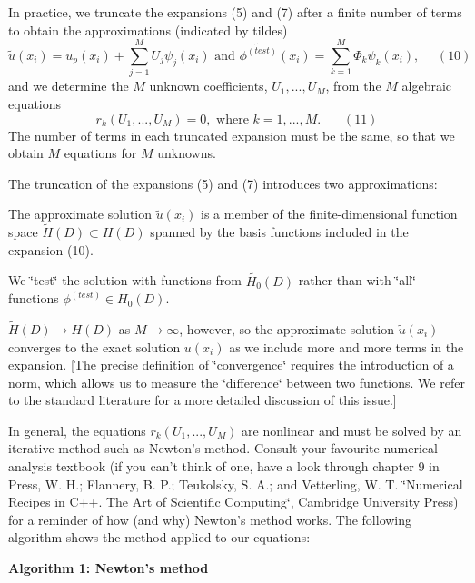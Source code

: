 In practice, we truncate the expansions (5) and (7) after a finite number of terms to obtain the approximations (indicated by tildes) \[ \widetilde{u}(x_i) = u_p(x_i) + \sum_{j=1}^{M} U_j \psi_j(x_i) \mbox{ \ \ and \ \ } \widetilde{\phi^{(test)}}(x_i) = \sum_{k=1}^{M} \Phi_k \psi_k(x_i), \ \ \ \ \ \ (10) \] and we determine the $M$ unknown coefficients, $U_1,...,U_M$, from the $M$ algebraic equations \[ r_k(U_1,...,U_M)=0, \mbox{\ \ where \ \ $k=1,...,M$}. \ \ \ \ \ \ \ \ (11) \] The number of terms in each truncated expansion must be the same, so that we obtain $M$ equations for $M$ unknowns.

The truncation of the expansions (5) and (7) introduces two approximations\-:
\begin{DoxyItemize}
\item The approximate solution $ \widetilde{u}(x_i) $ is a member of the finite-\/dimensional function space $\widetilde{H}(D) \subset H(D)$ spanned by the basis functions included in the expansion (10).
\item We \char`\"{}test\char`\"{} the solution with functions from $ \widetilde{H_{0}}(D) $ rather than with \char`\"{}all\char`\"{} functions $ \phi^{(test)} \in H_0(D). $
\end{DoxyItemize}$\widetilde{H}(D) \to H(D)$ as $M \to \infty$, however, so the approximate solution $\widetilde{u}(x_i)$ converges to the exact solution $u(x_i)$ as we include more and more terms in the expansion. \mbox{[}The precise definition of \char`\"{}convergence\char`\"{} requires the introduction of a norm, which allows us to measure the \char`\"{}difference\char`\"{} between two functions. We refer to the standard literature for a more detailed discussion of this issue.\mbox{]}

In general, the equations $r_k(U_1,...,U_M)$ are nonlinear and must be solved by an iterative method such as Newton's method. Consult your favourite numerical analysis textbook (if you can't think of one, have a look through chapter 9 in Press, W. H.; Flannery, B. P.; Teukolsky, S. A.; and Vetterling, W. T. \char`\"{}\-Numerical Recipes in C++.
\-The Art of Scientific Computing\char`\"{}, Cambridge University Press) for a reminder of how (and why) Newton's method works. The following algorithm shows the method applied to our equations\-:

\label{index_Newton}%
\hypertarget{index_Newton}{}%
 \begin{center} {\bfseries  Algorithm 1\-: Newton's method } \end{center} 


